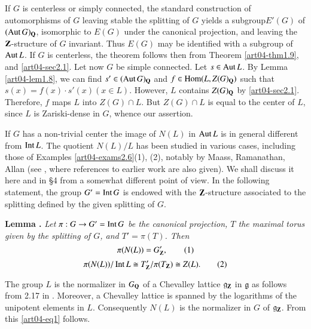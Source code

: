If $G$ is centerless or simply connected, the standard construction of automorphisms of $G$ leaving stable the splitting of $G$ yields a subgroup\pageoriginale $E'(G)$ of $(\operatorname{\mathrm{Aut}} G)_{\mathbf{Q}}$, isomorphic to $E(G)$ under the canonical projection, and leaving the $\mathbf{Z}$-structure of $G$ invariant. Thus $E(G)$ may be identified with a subgroup of $\operatorname{\mathrm{Aut}} L$. If $G$ is centerless, the theorem follows then from Theorem \ref{art04-thm1.9}, and \ref{art04-sec2.1}. Let now $G$ be simple connected. Let $s\in \operatorname{\mathrm{Aut}} L$. By Lemma \ref{art04-lem1.8}, we can find $s'\in (\operatorname{\mathrm{Aut}} G)_{\mathbf{Q}}$ and $f\in \operatorname{\mathrm{Hom}} (L,Z(G)_{\mathbf{Q}})$ such that $s(x)=f(x)\cdot s'(x)(x\in L)$. However, $L$ contains $Z(G)_{\mathbf{Q}}$ by \ref{art04-sec2.1}. Therefore, $f$ maps $L$ into $Z(G)\cap L$. But $Z(G)\cap L$ is equal to the center of $L$, since $L$ is Zariski-dense in $G$, whence our assertion.

If $G$ has a non-trivial center the image of $N(L)$ in $\operatorname{\mathrm{Aut}} L$ is in general different from $\operatorname{\mathrm{Int}} L$. The quotient $N(L)/L$ has been studied in various cases, including those of Examples \ref{art04-exams2.6}(1), (2), notably by Maass, Ramanathan, Allan (see \cite{art04-key1}, where references to earlier work are also given). We shall discuss it here and in \S4 from a somewhat different point of view. In the following statement, the group $G'=\operatorname{\mathrm{Int}} G$ is endowed with the $\mathbf{Z}$-structure associated to the splitting defined by the given splitting of $G$.

\medskip
\noindent
{\bf Lemma .\label{art04-lem2.3}}
{\em Let $\pi:G\to G'=\operatorname{\mathrm{Int}} G$ be the canonical projection, $T$ the maximal torus given by the splitting of $G$, and $T'=\pi(T)$. Then}
\begin{equation*}
\pi(N(L))=G'_{\mathbf{Z}},\tag{1}\label{art04-eq1}
\end{equation*}
\begin{equation*}
\pi(N(L))/\operatorname{\mathrm{Int}} L\cong T'_{\mathbf{Z}}/\pi (T_{\mathbf{Z}})\cong Z(L).\tag{2}\label{art04-eq2}
\end{equation*}
\smallskip

The group $L$ is the normalizer in $G_{\mathbf{Q}}$ of a Chevalley lattice $\mathfrak{g}_{\mathbf{Z}}$ in $\mathfrak{g}$ as follows from 2.17 in \cite{art04-key16}. Moreover, a Chevalley lattice is spanned by the logarithms of the unipotent elements in $L$. Consequently $N(L)$ is the normalizer in $G$ of $\mathfrak{g}_{\mathbf{Z}}$. From this \eqref{art04-eq1} follows.

